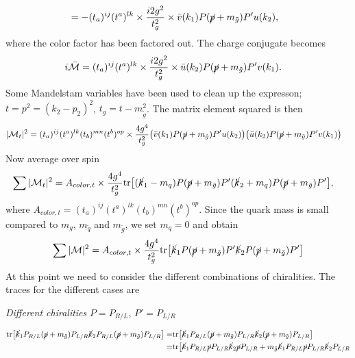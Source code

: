 \documentclass[11pt]{article}
\begin{document}
\begin{flushleft}
\begin{align*}
&= - (t_a)^{ij}(t^a)^{lk} \times \frac{i 2 g^2}{t_g^2} \times  \bar{v} (k_1)  P (\cancel{p} + m_{\tilde{g}}) P' u(k_2) ,
\end{align*}
where the color factor has been factored out. The charge conjugate becomes
\begin{align*}
i \mathcal{\bar{M}} & = (t_a)^{ij}(t^a)^{lk} \times \frac{i 2 g^2}{t_g^2} \times \bar{u} (k_2)  P (\cancel{p} + m_{\tilde{g}}) P' v(k_1) .
\end{align*}
Some Mandelstam variables have been used to clean up the expresson; $t= p^2 = (k_2 - p_2)^2$, $t_g = t - m_{\tilde{g}}^2$. The matrix element squared is then
\begin{align*}
|\mathcal{M}_t|^2 &=  (t_a)^{ij} (t^a)^{lk} (t_b)^{mn} (t^b)^{op} \times \frac{4 g^4}{t_g^2}
\big( \bar{v} (k_1)  P (\cancel{p} + m_{\tilde{g}}) P' u(k_2) \big)
\big( \bar{u} (k_2)  P (\cancel{p} + m_{\tilde{g}}) P' v(k_1) \big)
\end{align*}
Now average over spin
\begin{align*}
\sum |\mathcal{M}_t|^2 &=A_{color, t} \times  \frac{4 g^4}{t_g^2} \text{tr} \big[
(\cancel{k}_1 - m_q)  P (\cancel{p} + m_{\tilde{g}}) P' (\cancel{k}_2 + m_q)  P (\cancel{p} + m_{\tilde{g}}) P' \big],
\end{align*}
where $A_{color, t}= (t_a)^{ij} (t^a)^{lk} (t_b)^{mn} (t^b)^{op}$. Since the quark mass is small compared to $m_g$, $m_{\tilde{q}}$ and $m_{\tilde{g}}$, we set $m_q=0$ and obtain
\begin{align*}
\sum |\mathcal{M}|^2 &= A_{color, t} \times \frac{4 g^4}{t_g^2} \text{tr} \big[ 
\cancel{k}_1 P (\cancel{p} + m_{\tilde{g}}) P' \cancel{k}_2 P (\cancel{p} + m_{\tilde{g}}) P' \big]\\
\end{align*}
At this point we need to consider the different combinations of chiralities. The traces for the different cases are
\begin{center}
\textit{Different chiralities }$P=P_{R/L}$, $P'=P_{L/R}$
\end{center}
\begin{align*}
\text{tr} \big[ 
\cancel{k}_1 P_{R/L} (\cancel{p} + m_{\tilde{g}}) P_{L/R} \cancel{k}_2 P_{R/L} (\cancel{p} + m_{\tilde{g}}) P_{L/R} \big]=& \text{tr} \big[ 
\cancel{k}_1 P_{R/L} (\cancel{p} + m_{\tilde{g}}) P_{L/R} \cancel{k}_2(\cancel{p} + m_{\tilde{g}}) P_{L/R} \big] \\
=& \text{tr} \big[ 
\cancel{k}_1 P_{R/L} \cancel{p} P_{L/R} \cancel{k}_2 \cancel{p} P_{L/R}
+ m_{\tilde{g}} \cancel{k}_1 P_{R/L} \cancel{p} P_{L/R} \cancel{k}_2  P_{L/R}\\

\end{align*}
\end{flushleft}
\end{document}
